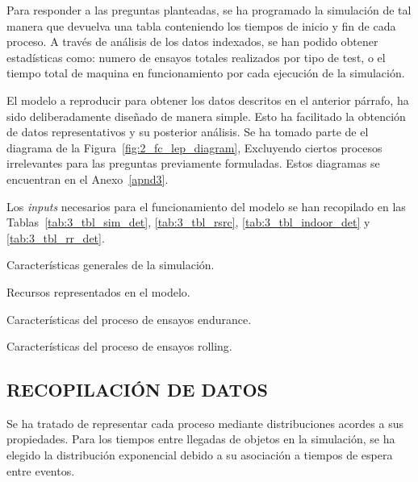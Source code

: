 Para responder a las preguntas planteadas,
se ha programado la simulación de tal manera que devuelva una tabla
conteniendo los tiempos de inicio y fin de cada proceso.
A través de análisis de los datos indexados,
se han podido obtener estadísticas como:
numero de ensayos totales realizados por tipo de test,
o el tiempo total de maquina en funcionamiento
por cada ejecución de la simulación.

El modelo a reproducir para obtener los datos descritos	en el anterior párrafo,
ha sido deliberadamente diseñado de manera simple.
Esto ha facilitado la obtención de datos representativos
y su posterior análisis.
Se ha tomado parte de el diagrama de la Figura~\ref{fig:2_fc_lep_diagram},
Excluyendo ciertos procesos irrelevantes
para las preguntas previamente formuladas.
Estos diagramas se encuentran en el Anexo~\ref{apnd3}.

Los \textit{inputs} necesarios para el funcionamiento del modelo
se han recopilado en las Tablas~\ref{tab:3_tbl_sim_det},
\ref{tab:3_tbl_rsrc},
\ref{tab:3_tbl_indoor_det}
y \ref{tab:3_tbl_rr_det}.

\begin{table}
	\centering
	\caption{Características generales de la simulación.}
	
	\label{tab:3_tbl_sim_det}
\end{table}

\begin{table}
	\centering
	\caption{Recursos representados en el modelo.}
	
	\label{tab:3_tbl_rsrc}
\end{table}

\begin{table}
	\centering
	\caption{Características del proceso de ensayos endurance.}
	
	\label{tab:3_tbl_indoor_det}
\end{table}

\begin{table}
	\centering
	\caption{Características del proceso de ensayos rolling.}
	
	\label{tab:3_tbl_rr_det}
\end{table}


\subsection{RECOPILACIÓN DE DATOS}

Se ha tratado de representar cada proceso mediante
distribuciones acordes a sus propiedades.
Para los tiempos entre llegadas de objetos en la simulación,
se ha elegido la distribución exponencial debido a
su asociación a tiempos de espera entre eventos.

